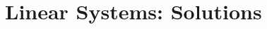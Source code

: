 \documentclass[a4paper, oneside]{book}
\begin{document}


\chapter{Linear Systems: Solutions}
\end{document}
